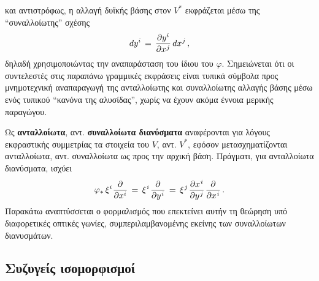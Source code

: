 \documentclass[11pt,a4paper,twoside,openright]{book}
\begin{document}
και αντιστρόφως, η αλλαγή δυϊκής βάσης στον $V^*$
εκφράζεται μέσω της ``συναλλοίωτης'' σχέσης
\begin{equation}\label{eq:covariance-elementary}
dy^{i}
\,=\,
\frac{\partial y^i}{\partial x^{\hspace{.5pt}j}}
\,
dx^{\hspace{.5pt}j}\,,
\end{equation}
\noindent
δηλαδή χρησιμοποιώντας την αναπαράσταση του ίδιου του $\varphi$.
Σημειώνεται ότι οι συντελεστές στις παραπάνω γραμμικές
εκφράσεις είναι τυπικά σύμβολα προς μνημοτεχνική αναπαραγωγή της ανταλλοίωτης και συναλλοίωτης αλλαγής βάσης μέσω ενός τυπικού ``κανόνα της αλυσίδας'', χωρίς να έχουν ακόμα έννοια μερικής παραγώγου.

Ως \textbf{ανταλλοίωτα}, αντ. \textbf{συναλλοίωτα διανύσματα} αναφέρονται για λόγους εκφραστικής συμμετρίας
τα στοιχεία του $V$, αντ. $V^*$,
εφόσον μετασχηματίζονται ανταλλοίωτα, αντ.
συναλλοίωτα ως προς την αρχική βάση.
Πράγματι, για ανταλλοίωτα διανύσματα, ισχύει
\begin{equation}\label{eq:transform-contravariant-vector}
\varphi_*\,\xi^i\hspace{.5pt}\frac{\partial}{\partial x^i}
\,=\,
\xi^{\hspace{.5pt}i} \hspace{1pt}
\frac{\partial}{\partial y^{\hspace{.5pt}i}}
\,=\,
\xi^{\hspace{.5pt}j} \hspace{1pt}
\frac{\partial x^{\hspace{.5pt}i}}{\partial y^{\hspace{.5pt}j}}
\hspace{1pt}
\frac{\partial}{\partial x^{\hspace{.5pt}i}}
\,.
\end{equation}
\noindent
Παρακάτω αναπτύσσεται ο φορμαλισμός που επεκτείνει
αυτήν τη θεώρηση υπό διαφορετικές οπτικές γωνίες,
συμπεριλαμβανομένης εκείνης των συναλλοίωτων διανυσμάτων.

\subsection{Συζυγείς ισομορφισμοί}
	\label{sec:adjoint-isomorphisms}
\end{document}
